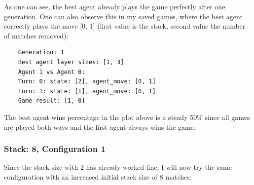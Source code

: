 \documentclass[11pt]{report}
\begin{document}
\begin{enumerate}
\begin{center}
    \end{center}

    As one can see, the best agent already plays the game perfectly after one generation.
    One can also observe this in my saved games, where the best agent correctly plays the move [0, 1] (first value is the stack, second value the number of matches removed):
    \begin{verbatim}
    Generation: 1
    Best agent layer sizes: [1, 3]
    Agent 1 vs Agent 0:
    Turn: 0: state: [2], agent_move: [0, 1]
    Turn: 1: state: [1], agent_move: [0, 1]
    Game result: [1, 0]
    \end{verbatim}
    The best agent wins percentage in the plot above is a steady 50\% since all games are played both ways and the first agent always wins the game.

    \subsubsection{Stack: 8, Configuration 1}
    Since the stack size with 2 has already worked fine, I will now try the same configuration with an increased initial stack size of 8 matches:
    \\
    \renewcommand{\csvpath}{../data/simple_nim/stack_8/t_1/stats.csv} %
    \begin{center}
\end{center}
\end{enumerate}
\end{document}
